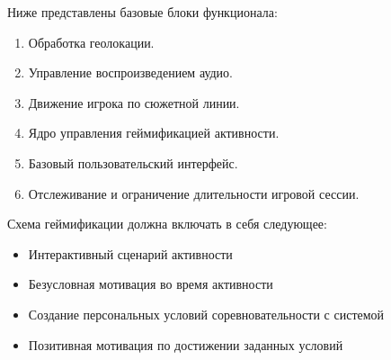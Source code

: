 Ниже представлены базовые блоки функционала:
\begin{enumerate}
	\item Обработка геолокации.
	\item Управление воспроизведением аудио.
	\item Движение игрока по сюжетной линии.
	\item Ядро управления геймификацией активности.
	\item Базовый пользовательский интерфейс.
	\item Отслеживание и ограничение длительности игровой сессии.
\end{enumerate}
\smallskip
Схема геймификации должна включать в себя следующее:
\begin{itemize}
	\item Интерактивный сценарий активности
	\item Безусловная мотивация во время активности
	\item Создание персональных условий соревновательности с системой
	\item Позитивная мотивация по достижении заданных условий
\end{itemize}